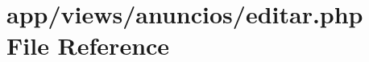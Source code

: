 \hypertarget{anuncios_2editar_8php}{}\section{app/views/anuncios/editar.php File Reference}
\label{anuncios_2editar_8php}

